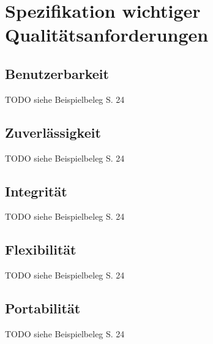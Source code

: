 \chapter{Spezifikation wichtiger Qualitätsanforderungen}
\section{Benutzerbarkeit}
TODO siehe Beispielbeleg S. 24

\section{Zuverlässigkeit}
TODO siehe Beispielbeleg S. 24

\section{Integrität}
TODO siehe Beispielbeleg S. 24

\section{Flexibilität}
TODO siehe Beispielbeleg S. 24

\section{Portabilität}
TODO siehe Beispielbeleg S. 24